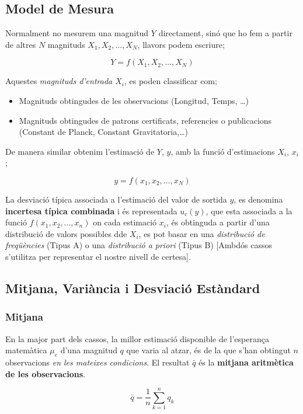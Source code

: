 \documentclass[12pt]{article}
\begin{document}
\subsection{Model de Mesura}

Normalment no mesurem una magnitud $Y$ directament, sinó que ho fem a partir de altres $N$ magnituds $X_1, X_2,\dots, X_N$, llavors podem escriure;

\[Y = f(X_1, X_2, \dots, X_N)\]

Aquestes \textit{magnituds d'entrada $X_i$}, es poden classificar com;

\begin{itemize}
    \item Magnituds obtingudes de les observacions (Longitud, Temps, \dots)
    \item Magnituds obtingudes de patrons certificats, referencies o publicacions (Constant de Planck, Constant Gravitatoria,\dots)
\end{itemize}

De manera similar obtenim l'estimació de $Y$, $y$, amb la funció d'estimacions $X_i$, $x_i$;

\[y = f(x_1,x_2,\dots,x_N)\]

La desviació típica associada a l'estimació del valor de sortida $y$, es denomina \textbf{incertesa típica combinada} i és representada $u_c(y)$, que esta associada a la funció $f(x_1,x_2,\dots,x_n)$ on cada estimació $x_i$, és obtinguda a partir d'una distribució de valors possibles dde $X_i$, es pot basar en una \textit{distribució de freqüències} (Tipus A) o una \textit{distribució a priori} (Tipus B) [Ambdós cassos s'utilitza per representar el nostre nivell de certesa].

\subsection{Mitjana, Variància i Desviació Estàndard}

\subsubsection{Mitjana}

En la major part dels cassos, la millor estimació disponible de l'esperança matemàtica $\mu_e$ d'una magnitud $q$ que varia al atzar, és de la que s'han obtingut $n$ observacions \textit{en les mateixes condicions}. El resultat $\bar{q}$ és la \textbf{mitjana aritmètica de les observacions}.

\[\bar{q} = \frac{1}{n} \sum_{k = 1}^{n} q_k\]
\end{document}
